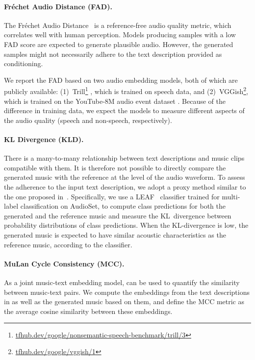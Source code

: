\paragraph{Fréchet Audio Distance (FAD).}
The Fréchet Audio Distance~\cite{fad} is a reference-free audio quality metric, which correlates well with human perception.
Models producing samples with a low FAD score are expected to generate plausible audio. However, the generated samples might not necessarily adhere to the text description provided as conditioning.

We report the FAD based on two audio embedding models, both of which are publicly available: (1)~Trill\footnote{\href{https://tfhub.dev/google/nonsemantic-speech-benchmark/trill/3}{tfhub.dev/google/nonsemantic-speech-benchmark/trill/3}} \cite{trill}, which is trained on speech data, and (2)~VGGish\footnote{\href{https://tfhub.dev/google/vggish/1}{tfhub.dev/google/vggish/1}}, \cite{cnn-for-audio-cls} which is trained on the YouTube-8M audio event dataset \cite{yt8m-data}.
Because of the difference in training data, we expect the models to measure different aspects of the audio quality (speech and non-speech, respectively).

\paragraph{KL Divergence (KLD).}
There is a many-to-many relationship between text descriptions and music clips compatible with them. It is therefore not possible to directly compare the generated music with the reference at the level of the audio waveform. To assess the adherence to the input text description, we adopt a proxy method similar to the one proposed in~\citet{yang2022diffsound, audiogen}. Specifically, we use a LEAF~\citep{zeghidour_leaf} classifier trained for multi-label classification on AudioSet, to compute class predictions for both the generated and the reference music and measure the KL~divergence between probability distributions of class predictions. When the KL-divergence is low, the generated music is expected to have similar acoustic characteristics as the reference music, according to the classifier.%

\paragraph{MuLan Cycle Consistency (MCC).}
As a joint music-text embedding model, {\mulan} can be used to quantify the similarity between music-text pairs. We compute the {\mulan} embeddings from the text descriptions in {\dataset} as well as the generated music based on them, and define the MCC metric as the average cosine similarity between these embeddings.

